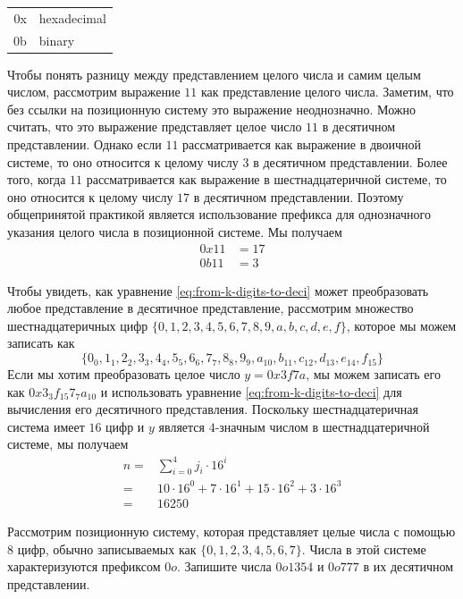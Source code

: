 \begin{center}
\begin{tabular}{rl}
 0x & hexadecimal \\
 0b & binary
\end{tabular}
\end{center} 
\begin{example}
Чтобы понять разницу между представлением целого числа и самим целым числом, рассмотрим выражение $11$ как представление целого числа. Заметим, что без ссылки на позиционную систему это выражение неоднозначно. Можно считать, что это выражение представляет целое число $11$ в десятичном представлении. Однако если $11$ рассматривается как выражение в двоичной системе, то оно относится к целому числу $3$ в десятичном представлении. Более того, когда $11$ рассматривается как выражение в шестнадцатеричной системе, то оно относится к целому числу $17$ в десятичном представлении. Поэтому общепринятой практикой является использование префикса для однозначного указания целого числа в позиционной системе. Мы получаем
\begin{align*}
0x11 & = 17\\
0b11 & = 3
\end{align*}
\end{example}
\begin{example} Чтобы увидеть, как уравнение 
\ref{eq:from-k-digits-to-deci} может преобразовать любое представление в десятичное представление, рассмотрим множество шестнадцатеричных цифр $\{0,1,2,3,4,5,6,7,8,9,a,b,c,d,e,f\}$, которое мы можем записать как 
$$\{0_0,1_1,2_2,3_3,4_4,5_5,6_6,7_7,8_8,9_9,a_{10},b_{11},c_{12},d_{13},e_{14},f_{15}\}$$
Если мы хотим преобразовать целое число $y=0x3f7a$, мы можем записать его как $0x3_3f_{15}7_7a_{10}$ и использовать уравнение \ref{eq:from-k-digits-to-deci} для вычисления его десятичного представления. Поскольку шестнадцатеричная система имеет $16$ цифр и $y$ является $4$-значным числом в шестнадцатеричной системе, мы получаем
\begin{align*}
n = & \sum_{i=0}^4 j_i\cdot 16^{i} \\
  = & 10\cdot 16^0+7\cdot 16^1+15\cdot 16^2+3\cdot 16^3\\
  = & 16250
\end{align*}
\end{example}
\begin{exercise}Рассмотрим  позиционную систему, которая представляет целые числа с помощью 8 цифр, обычно записываемых как $\{0,1,2,3,4,5,6,7\}$. Числа в этой системе характеризуются префиксом $0o$. Запишите числа $0o1354$ и $0o777$ в их десятичном представлении.
\end{exercise}


